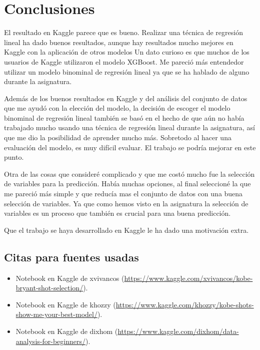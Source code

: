 \documentclass[
]{article}
\providecommand{\tightlist}{%
  \setlength{\itemsep}{0pt}\setlength{\parskip}{0pt}}
\begin{document}
\hypertarget{conclusiones}{%
\section{\texorpdfstring{\textbf{Conclusiones}}{Conclusiones}}\label{conclusiones}}

El resultado en Kaggle parece que es bueno. Realizar una técnica de
regresión lineal ha dado buenos resultados, aunque hay resultados mucho
mejores en Kaggle con la aplicación de otros modelos Un dato curioso es
que muchos de los usuarios de Kaggle utilizaron el modelo XGBoost. Me
pareció más entendedor utilizar un modelo binominal de regresión lineal
ya que se ha hablado de alguno durante la asignatura.

Además de los buenos resultados en Kaggle y del análisis del conjunto de
datos que me ayudó con la elección del modelo, la decisión de escoger el
modelo binominal de regresión lineal también se basó en el hecho de que
aún no había trabajado mucho usando una técnica de regresión lineal
durante la asignatura, así que me dio la posibilidad de aprender mucho
más. Sobretodo al hacer una evaluación del modelo, es muy difícil
evaluar. El trabajo se podría mejorar en este punto.

Otra de las cosas que consideré complicado y que me costó mucho fue la
selección de variables para la predicción. Había muchas opciones, al
final seleccioné la que me pareció más simple y que reducía mas el
conjunto de datos con una buena selección de variables. Ya que como
hemos visto en la asignatura la selección de variables es un proceso que
también es crucial para una buena predicción.

Que el trabajo se haya desarrollado en Kaggle le ha dado una motivación
extra.

\hypertarget{citas-para-fuentes-usadas}{%
\subsection{\texorpdfstring{\textbf{Citas para fuentes
usadas}}{Citas para fuentes usadas}}\label{citas-para-fuentes-usadas}}

\begin{itemize}
\tightlist
\item
  Notebook en Kaggle de xvivancos
  (\url{https://www.kaggle.com/xvivancos/kobe-bryant-shot-selection/}).
\item
  Notebook en Kaggle de khozzy
  (\url{https://www.kaggle.com/khozzy/kobe-shots-show-me-your-best-model/}).
\item
  Notebook en Kaggle de dixhom
  (\url{https://www.kaggle.com/dixhom/data-analysis-for-beginners/}).
\end{itemize}
\end{document}

